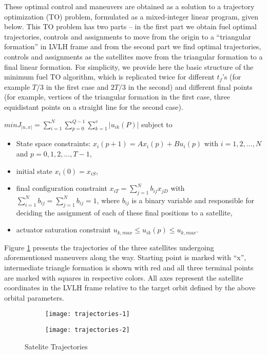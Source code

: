 These optimal control and maneuvers are obtained as a solution to a
trajectory optimization (TO) problem, formulated as a mixed-integer
linear program, given below. This TO problem has two parts – in the
first part we obtain fuel optimal trajectories, controls and
assignments to move from the origin to a ``triangular formation'' in
LVLH frame and from the second part we find optimal trajectories,
controls and assignments as the satellites move from the triangular
formation to a final linear formation. For simplicity, we provide here
the basic structure of the minimum fuel TO algorithm, which is
replicated twice for different $t_f$'s (for example $T/3$ in the first
case and $2T/3$ in the second) and different final points (for
example, vertices of the triangular formation in the first case, three
equidistant points on a straight line for the second case).

$min J_{|u,x|} = \sum_{i=1}^{N} \sum_{p=0}^{Q-1} \sum_{k=1}^{v} | u_{ik} (P)|$
subject to
\begin{itemize}
\item State space constraints:
  $x_i(p+1) = Ax_i(p)+Bu_i(p)$ with $i = 1,2,...,N$ and $p = 0,1,2,...,T-1$,
\item initial state $x_i(0) = x_{iS}$,
\item final configuration constraint
  $x_{iT} = \sum_{j=1}^{N}b_{ij}x_{jD}$
  with $\sum_{i=1}^{N}b_{ij} = \sum_{j=1}^{N}b_{ij} = 1$,
  where $b_{ij}$
  is a binary variable and responsible for deciding the assignment of
  each of these final positions to a satellite,
\item actuator saturation constraint $u_{k,max} \leq u_{ik}(p) \leq u_{k,max}$.
\end{itemize}

Figure \ref{fig:trajectories} presents the trajectories of the three
satellites undergoing aforementioned maneuvers along the way. Starting
point is marked with ``x'', intermediate triangle formation is shown
with red and all three terminal points are marked with squares in
respective colors. All axes represent the satellite coordinates in the
LVLH frame relative to the target orbit defined by the above orbital
parameters.

\begin{figure}
\centering

\begin{subfigure}{0.4\textwidth}
\texttt{[image: trajectories-1]}
\end{subfigure}

\hfill

\begin{subfigure}{0.4\textwidth}
\texttt{[image: trajectories-2]}
\end{subfigure}

\caption{Satelite Trajectories}
\label{fig:trajectories}
\end{figure}

